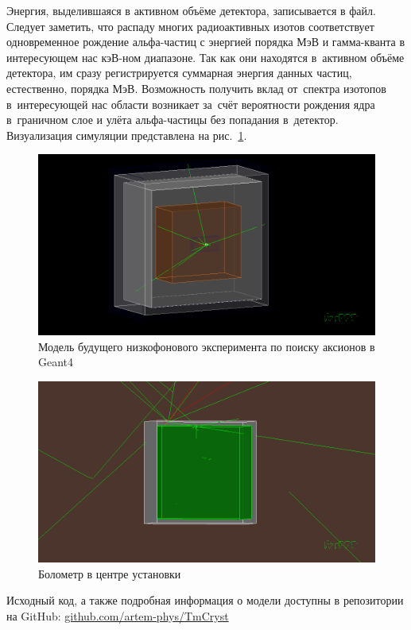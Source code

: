 \documentclass[a4paper,article,14pt]{extarticle}
\begin{document}
Энергия, выделившаяся в активном объёме детектора, записывается в файл.
Следует заметить, что распаду многих радиоактивных изотов соответствует одновременное рождение альфа-частиц с энергией порядка МэВ и гамма-кванта в интересующем нас кэВ-ном диапазоне.
Так как они находятся в~активном объёме детектора, им сразу регистрируется суммарная энергия данных частиц, естественно, порядка МэВ.
Возможность получить вклад от~спектра изотопов в~интересующей нас области возникает за~счёт вероятности рождения ядра в~граничном слое и улёта альфа-частицы без попадания в~детектор.
Визуализация симуляции представлена на рис.~\ref{fig:TmVis}.
\begin{figure}[t]
    \centering
    \includegraphics[width = 0.85 \textwidth]{images/TmCrystVis.png}
    \caption{Модель будущего низкофонового эксперимента по поиску аксионов в Geant4}
    \label{fig:TmVis}
\end{figure}
\begin{figure}[t]
    \centering
    \includegraphics[width = 0.85 \textwidth]{images/Bolometer.png}
    \caption{Болометр в центре установки}
    \label{TmVisBol}
\end{figure}

Исходный код, а также подробная информация о модели доступны в репозитории на GitHub: \href{https://github.com/artem-phys/TmCryst}{github.com/artem-phys/TmCryst}
\end{document}
